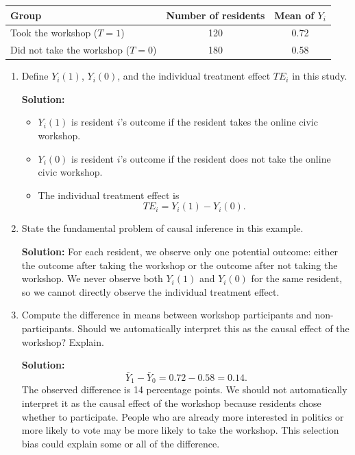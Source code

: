 \documentclass[11pt]{exam}
\begin{document}
\begin{questions}
\begin{center}
\begin{tabular}{lcc}
\toprule
Group & Number of residents & Mean of $Y_i$ \\
\midrule
Took the workshop ($T=1$)     & 120 & 0.72 \\
Did not take the workshop ($T=0$) & 180 & 0.58 \\
\bottomrule
\end{tabular}
\end{center}

\begin{enumerate}[leftmargin = 0.5cm, label = (\alph*), rightmargin = 0.2cm]
    \item Define $Y_i(1)$, $Y_i(0)$, and the individual treatment effect $TE_i$ in this study.

    \begin{solutionorbox}[7cm]
    \textbf{Solution:}
    \begin{itemize}[leftmargin = 0.6cm]
        \item $Y_i(1)$ is resident $i$'s outcome if the resident takes the online civic workshop.
        \item $Y_i(0)$ is resident $i$'s outcome if the resident does not take the online civic workshop.
        \item The individual treatment effect is
        \[
        TE_i=Y_i(1)-Y_i(0).
        \]
    \end{itemize}
    \end{solutionorbox}

    \item State the fundamental problem of causal inference in this example.

    \begin{solutionorbox}[5.2cm]
    \textbf{Solution:} For each resident, we observe only one potential outcome: either the outcome after taking the workshop or the outcome after not taking the workshop. We never observe both $Y_i(1)$ and $Y_i(0)$ for the same resident, so we cannot directly observe the individual treatment effect.
    \end{solutionorbox}

    \item Compute the difference in means between workshop participants and non-participants. Should we automatically interpret this as the causal effect of the workshop? Explain.

    \begin{solutionorbox}[6.8cm]
    \textbf{Solution:}
    \[
    \bar Y_1-\bar Y_0=0.72-0.58=0.14.
    \]
    The observed difference is 14 percentage points. We should not automatically interpret it as the causal effect of the workshop because residents chose whether to participate. People who are already more interested in politics or more likely to vote may be more likely to take the workshop. This selection bias could explain some or all of the difference.
    \end{solutionorbox}


\end{enumerate}
\end{questions}
\end{document}
